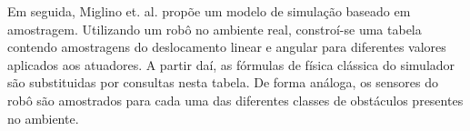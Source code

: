 Em seguida, Miglino et. al. \cite{miglino96evolving} propõe um modelo de simulação baseado em amostragem. Utilizando um robô no ambiente real, constroí-se uma tabela contendo amostragens do deslocamento linear e angular para diferentes valores aplicados aos atuadores. A partir daí, as fórmulas de física clássica do simulador são substituidas por consultas nesta tabela. De forma análoga, os sensores do robô são amostrados para cada uma das diferentes classes de obstáculos presentes no ambiente.

